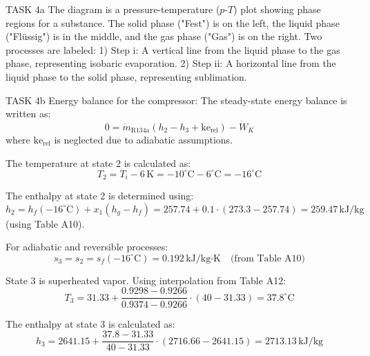 TASK 4a  
The diagram is a pressure-temperature (\( p \)-\( T \)) plot showing phase regions for a substance. The solid phase ("Fest") is on the left, the liquid phase ("Flüssig") is in the middle, and the gas phase ("Gas") is on the right. Two processes are labeled:  
1) Step i: A vertical line from the liquid phase to the gas phase, representing isobaric evaporation.  
2) Step ii: A horizontal line from the liquid phase to the solid phase, representing sublimation.  

TASK 4b  
Energy balance for the compressor:  
The steady-state energy balance is written as:  
\[
0 = \dot{m}_{\text{R134a}} \left( h_2 - h_3 + \text{ke}_{\text{rel}} \right) - \dot{W}_K
\]  
where \( \text{ke}_{\text{rel}} \) is neglected due to adiabatic assumptions.  

The temperature at state 2 is calculated as:  
\[
T_2 = T_i - 6 \, \text{K} = -10^\circ\text{C} - 6^\circ\text{C} = -16^\circ\text{C}
\]  

The enthalpy at state 2 is determined using:  
\[
h_2 = h_f(-16^\circ\text{C}) + x_1 \left( h_g - h_f \right) = 257.74 + 0.1 \cdot (273.3 - 257.74) = 259.47 \, \text{kJ/kg}
\]  
(using Table A10).  

For adiabatic and reversible processes:  
\[
s_3 = s_2 = s_f(-16^\circ\text{C}) = 0.192 \, \text{kJ/kg·K} \quad \text{(from Table A10)}  
\]  

State 3 is superheated vapor. Using interpolation from Table A12:  
\[
T_3 = 31.33 + \frac{0.9298 - 0.9266}{0.9374 - 0.9266} \cdot (40 - 31.33) = 37.8^\circ\text{C}
\]  

The enthalpy at state 3 is calculated as:  
\[
h_3 = 2641.15 + \frac{37.8 - 31.33}{40 - 31.33} \cdot (2716.66 - 2641.15) = 2713.13 \, \text{kJ/kg}
\]